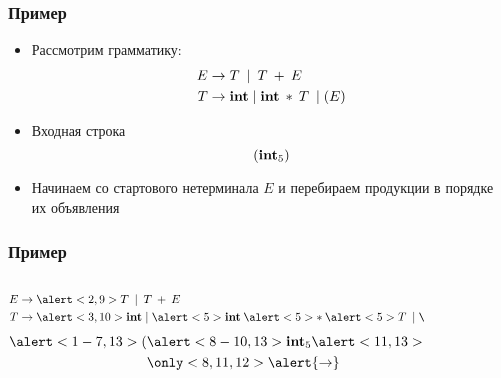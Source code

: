 \documentclass[16pt,pdf,unicode]{beamer}
\begin{document}
\begin{frame}
\frametitle{Пример}
\begin{itemize}
  \item Рассмотрим грамматику:
  \begin{align*}
    E &\rightarrow T \: \mid \: T \: + \: E \\
    T &\rightarrow \bold{int} \mid \bold{int} \: * \: T \: \mid (E)
  \end{align*}
  \item Входная строка
    $$(\bold{int}_5)$$
  \item Начинаем со стартового нетерминала $E$ и перебираем продукции в порядке их объявления
\end{itemize}
\end{frame}

\begin{frame}
\frametitle{Пример}
\begin{columns}
  \begin{column}{0.5\textwidth}
  \begin{align*}
    E &\rightarrow \alert<2,9>{T} \: \mid \: T \: + \: E \\
    T &\rightarrow \alert<3,10>{\bold{int}} \mid \alert<5>{\bold{int}} \: \alert<5>{*} \: \alert<5>{T} \: \mid \alert<7>{(E)}
  \end{align*}
  \vspace{1cm}  
  \begin{align*}
    \alert<1-7,13>{(} & \alert<8-10,13>{\bold{int}_5} \alert<11,13>{)} \\
    &\only<8,11,12>{\alert{\rightarrow}}
  \end{align*}
  \end{column}
  \begin{column}{0.5\textwidth}
  \begin{figure}
  \end{figure}
  \end{column}
\end{columns}
\end{frame}
\end{document}
